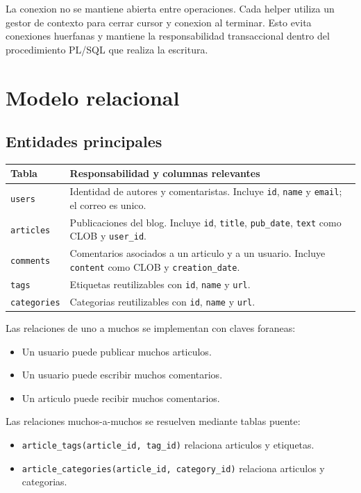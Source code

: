 \documentclass[12pt,a4paper]{article}
\begin{document}
La conexion no se mantiene abierta entre operaciones. Cada helper utiliza un
gestor de contexto para cerrar cursor y conexion al terminar. Esto evita
conexiones huerfanas y mantiene la responsabilidad transaccional dentro del
procedimiento PL/SQL que realiza la escritura.

\section{Modelo relacional}

\subsection{Entidades principales}

\begin{longtable}{p{}p{}}
\toprule
\textbf{Tabla} & \textbf{Responsabilidad y columnas relevantes} \\
\midrule
\texttt{users} & Identidad de autores y comentaristas. Incluye \texttt{id}, \texttt{name} y \texttt{email}; el correo es unico. \\
\texttt{articles} & Publicaciones del blog. Incluye \texttt{id}, \texttt{title}, \texttt{pub\_date}, \texttt{text} como CLOB y \texttt{user\_id}. \\
\texttt{comments} & Comentarios asociados a un articulo y a un usuario. Incluye \texttt{content} como CLOB y \texttt{creation\_date}. \\
\texttt{tags} & Etiquetas reutilizables con \texttt{id}, \texttt{name} y \texttt{url}. \\
\texttt{categories} & Categorias reutilizables con \texttt{id}, \texttt{name} y \texttt{url}. \\
\bottomrule
\end{longtable}

Las relaciones de uno a muchos se implementan con claves foraneas:

\begin{itemize}
    \item Un usuario puede publicar muchos articulos.
    \item Un usuario puede escribir muchos comentarios.
    \item Un articulo puede recibir muchos comentarios.
\end{itemize}

Las relaciones muchos-a-muchos se resuelven mediante tablas puente:

\begin{itemize}
    \item \texttt{article\_tags(article\_id, tag\_id)} relaciona articulos y etiquetas.
    \item \texttt{article\_categories(article\_id, category\_id)} relaciona articulos y categorias.
\end{itemize}
\end{document}
